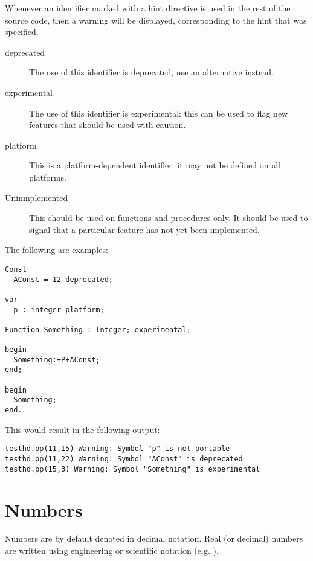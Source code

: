 
Whenever an identifier marked with a hint directive is used in the rest of the source 
code, then a warning will be displayed, corresponding to the hint that was specified.
\begin{description}
\item[deprecated] The use of this identifier is deprecated, use an
alternative instead.
\item[experimental] The use of this identifier is experimental: this can be
used to flag new features that should be used with caution.
\item[platform] This is a platform-dependent identifier: it may not be
defined on all platforms.
\item[Uninmplemented] This should be used on functions and procedures only.
It should be used to signal that a particular feature has not yet been
implemented.
\end{description}

The following are examples:
\begin{verbatim}
Const
  AConst = 12 deprecated;

var
  p : integer platform;

Function Something : Integer; experimental;

begin
  Something:=P+AConst;
end;

begin
  Something;
end.
\end{verbatim}
This would result in the following output:
\begin{verbatim}
testhd.pp(11,15) Warning: Symbol "p" is not portable
testhd.pp(11,22) Warning: Symbol "AConst" is deprecated
testhd.pp(15,3) Warning: Symbol "Something" is experimental
\end{verbatim}

\section{Numbers}
Numbers are by default denoted in decimal notation.
Real (or decimal) numbers are written using engineering or scientific
notation (e.g. ).

